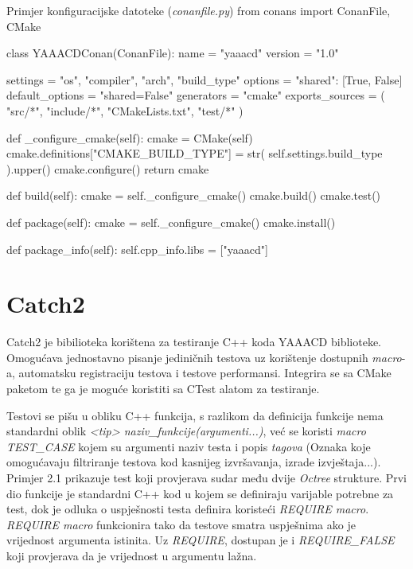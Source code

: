 \begin{pythonSource}{Primjer konfiguracijske datoteke (\textit{conanfile.py})}
from conans import ConanFile, CMake


class YAAACDConan(ConanFile):
    name = "yaaacd"
    version = "1.0"

    settings = "os", "compiler", "arch", "build_type"
    options = {"shared": [True, False]}
    default_options = "shared=False"
    generators = "cmake"
    exports_sources = (
        "src/*",
        "include/*",
        "CMakeLists.txt",
        "test/*"
    )

    def _configure_cmake(self):
        cmake = CMake(self)
        cmake.definitions["CMAKE_BUILD_TYPE"] = str(
            self.settings.build_type
        ).upper()
        cmake.configure()
        return cmake

    def build(self):
        cmake = self._configure_cmake()
        cmake.build()
        cmake.test()

    def package(self):
        cmake = self._configure_cmake()
        cmake.install()

    def package_info(self):
        self.cpp_info.libs = ["yaaacd"]
\end{pythonSource}

\pagebreak

\section{Catch2}

Catch2 je bibilioteka korištena za testiranje C++ koda YAAACD biblioteke.
Omogućava jednostavno pisanje jediničnih testova uz korištenje dostupnih
\textit{macro}-a, automatsku registraciju testova i testove performansi.
Integrira se sa CMake paketom te ga je moguće koristiti sa CTest alatom
za testiranje.

Testovi se pišu u obliku C++ funkcija, s razlikom da definicija funkcije nema standardni oblik
\textit{<tip> naziv\_funkcije(argumenti...)}, već se koristi \textit{macro TEST\_CASE} kojem su argumenti
naziv testa i popis \textit{tagova} (Oznaka koje omogućavaju filtriranje testova kod kasnijeg izvršavanja, izrade izvještaja...). \\
Primjer 2.1 prikazuje test koji provjerava sudar među dvije \textit{Octree} strukture. Prvi dio funkcije je standardni C++ kod u kojem se
definiraju varijable potrebne za test, dok je odluka o uspješnosti testa definira koristeći \textit{REQUIRE macro}. \textit{REQUIRE macro}
funkcionira tako da testove smatra uspješnima ako je vrijednost argumenta istinita.
Uz \textit{REQUIRE}, dostupan je i \textit{REQUIRE\_FALSE} koji provjerava da je vrijednost u argumentu lažna.


